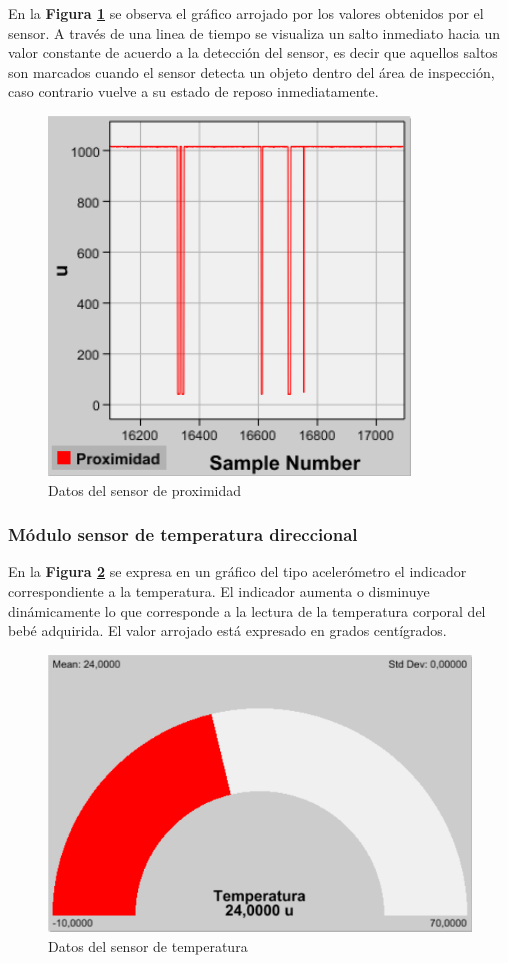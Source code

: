 \documentclass{IEEEtran}
\begin{document}
				En la \textbf{Figura \ref{proximidad}} se observa el gráfico arrojado por los valores obtenidos por el sensor. A través de una linea de tiempo se visualiza un salto inmediato hacia un valor constante de acuerdo a la detección del sensor, es decir que aquellos saltos son marcados cuando el sensor detecta un objeto dentro del área de inspección, caso contrario vuelve a su estado de reposo inmediatamente.
				\begin{figure}
					\centering
					\includegraphics[width=0.6\linewidth]{proximidad}
					\caption{Datos del sensor de proximidad}
					\label{proximidad}
				\end{figure}

			\subsubsection{Módulo sensor de temperatura direccional}

				En la \textbf{Figura \ref{temperatura}} se expresa en un gráfico del tipo acelerómetro el indicador correspondiente a la temperatura. El indicador aumenta o disminuye dinámicamente lo que corresponde a la lectura de la temperatura corporal del bebé adquirida. El valor arrojado está expresado en grados centígrados.

				\begin{figure}
					\centering
					\includegraphics[width=0.7\linewidth]{temperatura}
					\caption{Datos del sensor de temperatura}
					\label{temperatura}
				\end{figure}
\end{document}

